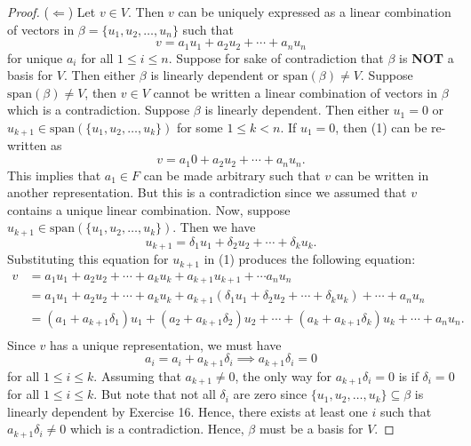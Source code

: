 \begin{proof}
(\( \Leftarrow \)) Let \( v \in V  \). Then \( v  \) can be uniquely expressed as a linear combination of vectors in \( \beta = \{ u_{1}, u_{2}, \dots, u_{n} \}  \) such that 
\[  v = a_{1} u_{1} + a_{2} u_{2} + \cdots + a_{n} u_{n} \tag{1} \]
for unique \( a_{i}  \) for all \(  1 \leq i \leq n \). Suppose for sake of contradiction that \( \beta  \) is \textbf{NOT} a basis for \( V  \). Then either \( \beta   \) is linearly dependent or \( \text{span}(\beta) \neq  V  \). Suppose \( \text{span}(\beta) \neq V  \), then \( v \in V  \) cannot be written a linear combination of vectors in \( \beta \) which is a contradiction. Suppose \( \beta \) is linearly dependent. Then either \( u_{1} = 0  \) or \( u_{k+1} \in \text{span}(\{ u_{1}, u_{2} , \dots, u_{k }  \} ) \) for some \(  1 \leq  k < n  \). If \( u_{1} = 0  \), then (1) can be re-written as
\[ v = a_{1} 0 + a_{2} u_{2} + \cdots + a_{n} u_{n}.   \]
This implies that \( a_{1} \in F  \) can be made arbitrary such that \( v  \) can be written in another representation. But this is a contradiction since we assumed that \( v  \) contains a unique linear combination. Now, suppose \( u_{k+1} \in \text{span}(\{ u_{1} , u_{2}, \dots, u_{k } \} ) \). Then we have 
\[  u_{k+1} = \delta_{1} u_{1} + \delta_{2} u_{2} + \cdots + \delta_{k} u_{k }.  \]
Substituting this equation for \( u_{k+1} \) in (1) produces the following equation:
\begin{align*}
    v &= a_{1} u_{1} +a_{2} u_{2} + \cdots + a_{k} u_{k} + a_{k+1} u_{k+1} + \cdots a_{n} u_{n}  \\
      &=  a_{1} u_{1} + a_{2} u_{2} + \cdots + a_{k} u_{k } + a_{k+1} ( \delta_{1} u_{1} + \delta_{2} u_{2} + \cdots + \delta_{k} u_{k }  ) + \cdots +  a_{n} u_{n} \\
     &= (a_{1} + a_{k+1} \delta_{1}) u_{1} +  (a_{2} + a_{k+1} \delta_{2}) u_{2} + \cdots + (a_{k } + a_{k+1} \delta_{k } ) u_{k } + \cdots + a_{n} u_{n}. \tag{2} \\
\end{align*}
Since \( v  \) has a unique representation, we must have 
\[  a_{i} = a_{i} + a_{k+1} \delta_{i } \implies  a_{k+1}\delta_{i} = 0 \tag{3}  \] 
for all \( 1 \leq i \leq k  \). Assuming that \( a_{k+1} \neq 0  \), the only way for \( a_{k+1} \delta_{i} = 0  \) is if \( \delta_{i} = 0   \) for all \( 1 \leq i \leq k    \). But note that not all \( \delta_{i}  \) are zero since \( \{ u_{1}, u_{2}, \dots, u_{k } \} \subseteq \beta \) is linearly dependent by Exercise 16. Hence, there exists at least one \( i  \) such that \( a_{k+1} \delta_{i} \neq  0  \) which is a contradiction. Hence, \( \beta \) must be a basis for \( V  \).


\end{proof}

